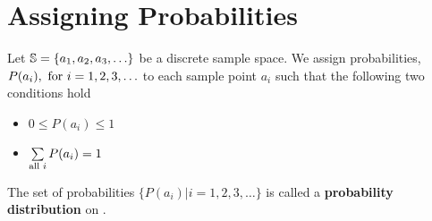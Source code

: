 \section{Assigning Probabilities}
Let $\mathbb{S} = \{a_1,a_2,a_3,\ldots\}$ be a discrete sample space. We assign probabilities, $P(a_i),\text{ for } i = 1,2,3,\ldots$ to each sample point $a_i$ such that the following two conditions hold
\begin{itemize}
    \item $0 \leq P(a_i) \leq 1$
    \item $\sum\limits_{\text{all } i} P(a_i) = 1$
\end{itemize}
The set of probabilities $\{P(a_i)|i = 1,2,3,\ldots\}$ is called a \textbf{probability distribution} on \sS.